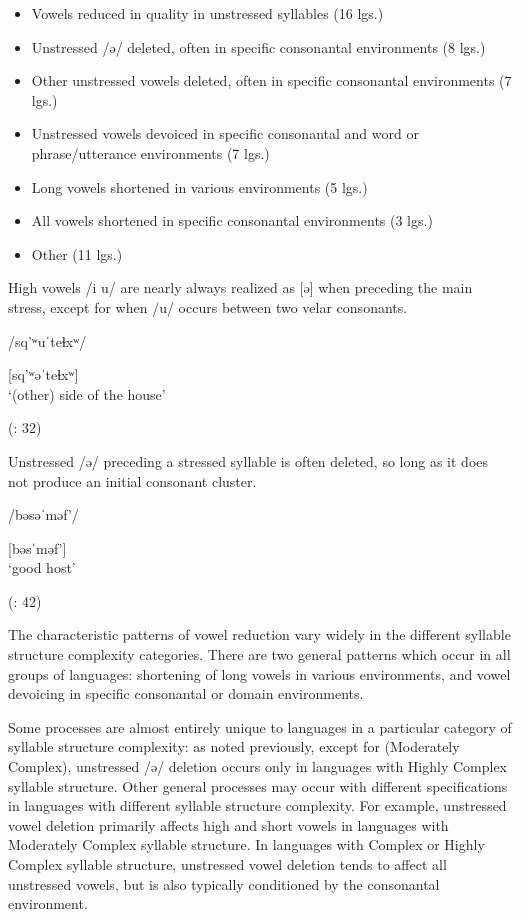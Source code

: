 \begin{itemize}
\item Vowels reduced in quality in unstressed syllables (16 lgs.)
\item Unstressed /ə/ deleted, often in specific consonantal environments {(8 lgs.)}
\item Other unstressed vowels deleted, often in specific consonantal environments (7 lgs.)
\item Unstressed vowels devoiced in specific consonantal and word or phrase/utterance environments (7 lgs.)
\item Long vowels shortened in various environments (5 lgs.)
\item All vowels shortened in specific consonantal environments  {(3 lgs.)}
\item Other (11 lgs.)
\end{itemize}

\ea  {}

High vowels /i u/ are nearly always realized as [ə] when preceding the main stress, except for when /u/ occurs between two velar consonants. 

/sq’ʷuˈteɬxʷ/

[sq’ʷəˈteɬxʷ]\\
\glt ‘(other) side of the house’

(\citealt{ThompsonThompson1992}: 32)

\ex  {}

Unstressed /ə/ preceding a stressed syllable is often deleted, so long as it does not produce an initial consonant cluster.

/bəsəˈməf’/

[bəsˈməf’]\\
\glt ‘good host’

(\citealt{GordonApplebaum2010}: 42)
\z
\z

  The characteristic patterns of vowel reduction vary widely in the different syllable structure complexity categories. There are two general patterns which occur in all groups of languages: shortening of long vowels in various environments, and vowel devoicing in specific consonantal or domain environments. 

  Some processes are almost entirely unique to languages in a particular category of syllable structure complexity: as noted previously, except for  (Moderately Complex), unstressed /ə/ deletion occurs only in languages with Highly Complex syllable structure. Other general processes may occur with different specifications in languages with different syllable structure complexity. For example, unstressed vowel deletion primarily affects high and short vowels in languages with Moderately Complex syllable structure. In languages with Complex or Highly Complex syllable structure, unstressed vowel deletion tends to affect all unstressed vowels, but is also typically conditioned by the consonantal environment.

